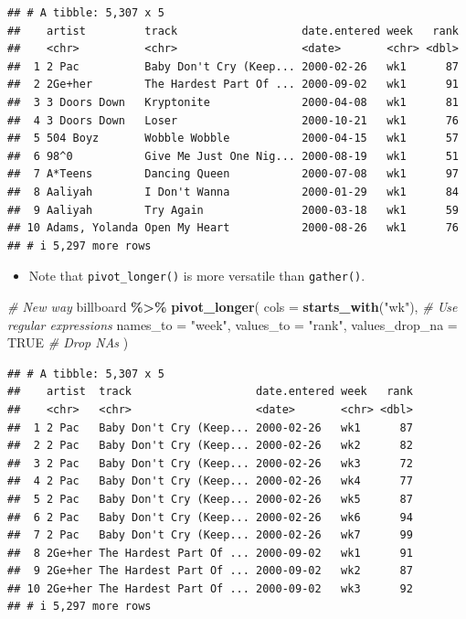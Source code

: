 \documentclass[
]{book}
\newenvironment{Shaded}{\begin{snugshade}}{\end{snugshade}}
\newcommand{\AttributeTok}[1]{\textcolor[rgb]{0.13,0.29,0.53}{#1}}
\newcommand{\CommentTok}[1]{\textcolor[rgb]{0.56,0.35,0.01}{\textit{#1}}}
\newcommand{\ConstantTok}[1]{\textcolor[rgb]{0.56,0.35,0.01}{#1}}
\newcommand{\FunctionTok}[1]{\textcolor[rgb]{0.13,0.29,0.53}{\textbf{#1}}}
\newcommand{\NormalTok}[1]{#1}
\newcommand{\SpecialCharTok}[1]{\textcolor[rgb]{0.81,0.36,0.00}{\textbf{#1}}}
\newcommand{\StringTok}[1]{\textcolor[rgb]{0.31,0.60,0.02}{#1}}
\providecommand{\tightlist}{%
  \setlength{\itemsep}{0pt}\setlength{\parskip}{0pt}}
\begin{document}
\begin{verbatim}
## # A tibble: 5,307 x 5
##    artist         track                   date.entered week   rank
##    <chr>          <chr>                   <date>       <chr> <dbl>
##  1 2 Pac          Baby Don't Cry (Keep... 2000-02-26   wk1      87
##  2 2Ge+her        The Hardest Part Of ... 2000-09-02   wk1      91
##  3 3 Doors Down   Kryptonite              2000-04-08   wk1      81
##  4 3 Doors Down   Loser                   2000-10-21   wk1      76
##  5 504 Boyz       Wobble Wobble           2000-04-15   wk1      57
##  6 98^0           Give Me Just One Nig... 2000-08-19   wk1      51
##  7 A*Teens        Dancing Queen           2000-07-08   wk1      97
##  8 Aaliyah        I Don't Wanna           2000-01-29   wk1      84
##  9 Aaliyah        Try Again               2000-03-18   wk1      59
## 10 Adams, Yolanda Open My Heart           2000-08-26   wk1      76
## # i 5,297 more rows
\end{verbatim}

\begin{itemize}
\tightlist
\item
  Note that \texttt{pivot\_longer()} is more versatile than \texttt{gather()}.
\end{itemize}

\begin{Shaded}
\begin{Highlighting}[]
\CommentTok{\# New way}
\NormalTok{billboard }\SpecialCharTok{\%\textgreater{}\%}
  \FunctionTok{pivot\_longer}\NormalTok{(}
    \AttributeTok{cols =} \FunctionTok{starts\_with}\NormalTok{(}\StringTok{"wk"}\NormalTok{), }\CommentTok{\# Use regular expressions}
    \AttributeTok{names\_to =} \StringTok{"week"}\NormalTok{,}
    \AttributeTok{values\_to =} \StringTok{"rank"}\NormalTok{,}
    \AttributeTok{values\_drop\_na =} \ConstantTok{TRUE} \CommentTok{\# Drop NAs}
\NormalTok{  )}
\end{Highlighting}
\end{Shaded}

\begin{verbatim}
## # A tibble: 5,307 x 5
##    artist  track                   date.entered week   rank
##    <chr>   <chr>                   <date>       <chr> <dbl>
##  1 2 Pac   Baby Don't Cry (Keep... 2000-02-26   wk1      87
##  2 2 Pac   Baby Don't Cry (Keep... 2000-02-26   wk2      82
##  3 2 Pac   Baby Don't Cry (Keep... 2000-02-26   wk3      72
##  4 2 Pac   Baby Don't Cry (Keep... 2000-02-26   wk4      77
##  5 2 Pac   Baby Don't Cry (Keep... 2000-02-26   wk5      87
##  6 2 Pac   Baby Don't Cry (Keep... 2000-02-26   wk6      94
##  7 2 Pac   Baby Don't Cry (Keep... 2000-02-26   wk7      99
##  8 2Ge+her The Hardest Part Of ... 2000-09-02   wk1      91
##  9 2Ge+her The Hardest Part Of ... 2000-09-02   wk2      87
## 10 2Ge+her The Hardest Part Of ... 2000-09-02   wk3      92
## # i 5,297 more rows
\end{verbatim}
\end{document}
